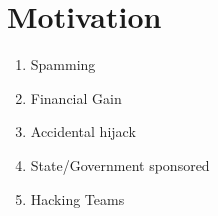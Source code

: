  \section{Motivation}\label{sec:motivation}
 
 \begin{enumerate}
 \item Spamming
 \item Financial Gain 
 \item Accidental hijack
 \item State/Government sponsored
 \item Hacking Teams
 \end{enumerate}
 